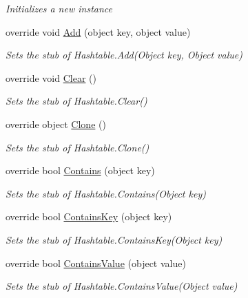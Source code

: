 \begin{DoxyCompactItemize}
\begin{DoxyCompactList}\small\item\em Initializes a new instance\end{DoxyCompactList}\item 
override void \hyperlink{class_system_1_1_collections_1_1_fakes_1_1_stub_hashtable_a922e968af65497555668748a0b43cf8d}{Add} (object key, object value)
\begin{DoxyCompactList}\small\item\em Sets the stub of Hashtable.\-Add(\-Object key, Object value)\end{DoxyCompactList}\item 
override void \hyperlink{class_system_1_1_collections_1_1_fakes_1_1_stub_hashtable_a063db7a2f5bdfd74389cbc022a074571}{Clear} ()
\begin{DoxyCompactList}\small\item\em Sets the stub of Hashtable.\-Clear()\end{DoxyCompactList}\item 
override object \hyperlink{class_system_1_1_collections_1_1_fakes_1_1_stub_hashtable_ad08eeb71fb02e5b804a8fe34225c2f7d}{Clone} ()
\begin{DoxyCompactList}\small\item\em Sets the stub of Hashtable.\-Clone()\end{DoxyCompactList}\item 
override bool \hyperlink{class_system_1_1_collections_1_1_fakes_1_1_stub_hashtable_adce8b8a0420e04ff601824aa5af336f9}{Contains} (object key)
\begin{DoxyCompactList}\small\item\em Sets the stub of Hashtable.\-Contains(\-Object key)\end{DoxyCompactList}\item 
override bool \hyperlink{class_system_1_1_collections_1_1_fakes_1_1_stub_hashtable_a862af7abe18c97b6398ddb6d857ed4a3}{Contains\-Key} (object key)
\begin{DoxyCompactList}\small\item\em Sets the stub of Hashtable.\-Contains\-Key(\-Object key)\end{DoxyCompactList}\item 
override bool \hyperlink{class_system_1_1_collections_1_1_fakes_1_1_stub_hashtable_a03a861bf78da4ab00cf93d096554bb11}{Contains\-Value} (object value)
\begin{DoxyCompactList}\small\item\em Sets the stub of Hashtable.\-Contains\-Value(\-Object value)\end{DoxyCompactList}\item 

\end{DoxyCompactItemize}
